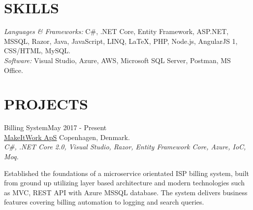 \documentclass[margin, 10pt, hidelinks]{res} %
\begin{document}
\begin{resume}


\section{SKILLS}

{\sl\large Languages \& Frameworks:} 
C\#, .NET Core, Entity Framework, ASP.NET, MSSQL, Razor, Java, JavaScript, LINQ, LaTeX,
{\color{black!70}PHP, Node.js, AngularJS 1, CSS/HTML, MySQL.} \\ 
{\sl\large  Software:} Visual Studio, Azure, AWS, Microsoft SQL Server, Postman, MS Office. 
\section{PROJECTS}

Billing System\hfill May 2017  - Present\\
\href{http://www.makeitwork.dk}{\underline{MakeItWork ApS}} \hfill Copenhagen, Denmark. \\
{\it C\#, .NET Core 2.0, Visual Studio, Razor, Entity Framework Core, Azure, IoC, Moq.}
\begin{description}
\item Established the foundations of a microservice orientated ISP billing system, built from ground up utilizing layer based architecture and modern technologies such as MVC, REST API with Azure MSSQL database. The system delivers business features covering billing automation to logging and search queries.
\end{description}


\end{resume}
\end{document}
